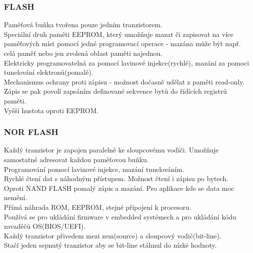 \subsubsection*{FLASH}
Paměťová buňka tvořena pouze jedním tranzistorem.\\
Speciální druh paměti EEPROM, který umožňuje mazat či zapisovat na více paměťových míst pomocí jedné programovací operace - mazána může být např. celá paměť nebo jen zvolená oblast paměti najednou. \\
Elektricky programovatelná za pomocí lavinové injekce(rychlé), mazání za pomoci tunelování elektronů(pomalé).\\
Mechanismus ochrany proti zápisu - možnost dočasně udělat z paměti read-only. Zápis se pak povolí zapsáním definované sekvence bytů do řídících registrů paměti.\\
Vyšší hustota oproti EEPROM. \\

\subsubsection*{NOR FLASH}
Každý tranzistor je zapojen paralelně ke sloupcovému vodiči. Umožňuje samostatně adresovat každou paměťovou buňku.\\
Programování pomocí lavinové injekce, mazání tunelováním. \\
Rychlé čtení dat s náhodným přístupem. Možnost čtení i zápisu po bytech.\\
Oproti NAND FLASH pomalý zápis a mazání. Pro aplikace kde se data moc nemění.\\
Přímá náhrada ROM, EEPROM, stejné připojení k procesoru.\\
Používá se pro ukládání firmware v embedded systémech a pro ukládání kódu zavaděčů OS(BIOS/UEFI).\\
Každý tranzistor přivedem mezi zem(source) a sloupcový vodič(bit-line).\\
Stačí jeden sepnutý tranzistor aby se bit-line stáhnul do nízké hodnoty. \\

